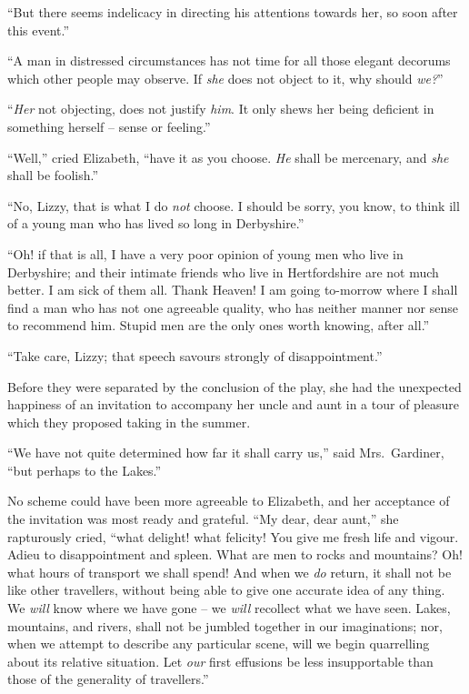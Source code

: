 “But there seems indelicacy in directing his attentions
towards her, so soon after this event.”

“A man in distressed circumstances has not time for
all those elegant decorums which other people may
observe. If \textit{she} does not object to it, why should \textit{we?}”

“\textit{Her} not objecting, does not justify \textit{him}. It only
shews her being deficient in something herself -- sense or
feeling.”

“Well,” cried Elizabeth, “have it as you choose. \textit{He}
shall be mercenary, and \textit{she} shall be foolish.”

“No, Lizzy, that is what I do \textit{not} choose. I should be
sorry, you know, to think ill of a young man who has lived
so long in Derbyshire.”

“Oh! if that is all, I have a very poor opinion of young
men who live in Derbyshire; and their intimate friends
who live in Hertfordshire are not much better. I am sick
of them all. Thank Heaven! I am going to-morrow where
I shall find a man who has not one agreeable quality, who
has neither manner nor sense to recommend him. Stupid
men are the only ones worth knowing, after all.”

“Take care, Lizzy; that speech savours strongly of
disappointment.”

Before they were separated by the conclusion of the
play, she had the unexpected happiness of an invitation
to accompany her uncle and aunt in a tour of pleasure
which they proposed taking in the summer.

“We have not quite determined how far it shall carry
us,” said Mrs.\ Gardiner, “but perhaps to the Lakes.”

No scheme could have been more agreeable to Elizabeth,
and her acceptance of the invitation was most ready and
grateful. “My dear, dear aunt,” she rapturously cried,
“what delight! what felicity! You give me fresh life
and vigour. Adieu to disappointment and spleen. What
are men to rocks and mountains? Oh! what hours of
transport we shall spend! And when we \textit{do} return, it shall
not be like other travellers, without being able to give
one accurate idea of any thing. We \textit{will} know where we
have gone -- we \textit{will} recollect what we have seen. Lakes,
mountains, and rivers, shall not be jumbled together in our
imaginations; nor, when we attempt to describe any
particular scene, will we begin quarrelling about its relative
situation. Let \textit{our} first effusions be less insupportable
than those of the generality of travellers.”

